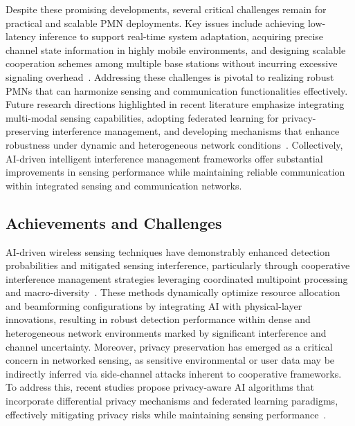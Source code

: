 \documentclass[sigconf]{acmart}
\begin{document}
Despite these promising developments, several critical challenges remain for practical and scalable PMN deployments. Key issues include achieving low-latency inference to support real-time system adaptation, acquiring precise channel state information in highly mobile environments, and designing scalable cooperation schemes among multiple base stations without incurring excessive signaling overhead~\cite{ref48}. Addressing these challenges is pivotal to realizing robust PMNs that can harmonize sensing and communication functionalities effectively. Future research directions highlighted in recent literature emphasize integrating multi-modal sensing capabilities, adopting federated learning for privacy-preserving interference management, and developing mechanisms that enhance robustness under dynamic and heterogeneous network conditions~\cite{ref48}. Collectively, AI-driven intelligent interference management frameworks offer substantial improvements in sensing performance while maintaining reliable communication within integrated sensing and communication networks.

\subsection{Achievements and Challenges}

AI-driven wireless sensing techniques have demonstrably enhanced detection probabilities and mitigated sensing interference, particularly through cooperative interference management strategies leveraging coordinated multipoint processing and macro-diversity~\cite{ref41,ref42,ref48}. These methods dynamically optimize resource allocation and beamforming configurations by integrating AI with physical-layer innovations, resulting in robust detection performance within dense and heterogeneous network environments marked by significant interference and channel uncertainty. Moreover, privacy preservation has emerged as a critical concern in networked sensing, as sensitive environmental or user data may be indirectly inferred via side-channel attacks inherent to cooperative frameworks. To address this, recent studies propose privacy-aware AI algorithms that incorporate differential privacy mechanisms and federated learning paradigms, effectively mitigating privacy risks while maintaining sensing performance~\cite{ref43,ref48}.
\end{document}
